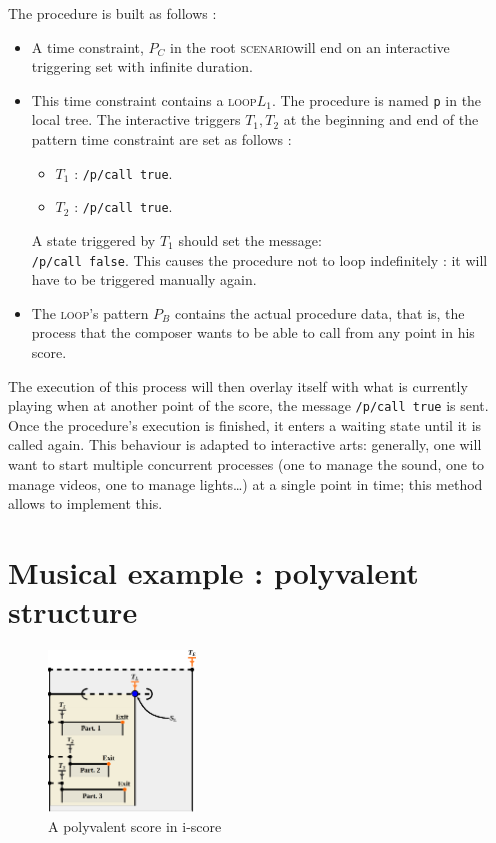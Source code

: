\documentclass{article}
\newcommand{\scenario}{\textsc{scenario}}
\newcommand{\Loop}{\textsc{loop}}
\begin{document}
The procedure is built as follows : 
\begin{itemize}
    \item A time constraint, $P_C$ in the root \scenario will end on an interactive triggering set with infinite duration.
    \item This time constraint contains a \Loop $L_1$. 
    The procedure is named \lstinline{p} in the local tree. 
    The interactive triggers $T_1, T_2$ at the beginning and end of the pattern time constraint are set as follows : 
    \begin{itemize}
        \item $T_1$ : \lstinline{/p/call true}.
        \item $T_2$ : \lstinline{/p/call true}.
    \end{itemize}
    A state triggered by $T_1$ should set the message:~\\
    \lstinline{/p/call false}. 
    This causes the procedure not to loop 
    indefinitely : it will have to be triggered manually again.
    \item The \Loop's pattern $P_B$ contains the actual procedure data, that is, the process that the composer wants to be able to call from any point in his score. 
\end{itemize}

The execution of this process will then overlay itself with what is currently playing when at another point of the score, 
the message \lstinline{/p/call true} is sent.
Once the procedure's execution is finished, it enters a waiting state until it is called again.
This behaviour is adapted to interactive arts: generally, one will want to start multiple 
concurrent processes (one to manage the sound, one to manage videos, one to manage lights\dots) at a single point in time; this method allows to implement this.

\section{Musical example : polyvalent structure}
\begin{figure}[h]
    \centering
    \includegraphics[width=0.35\textwidth]{images/partition.eps}
    \caption{A polyvalent score in i-score}
    \label{fig.polyvalent}
\end{figure}
\end{document}
